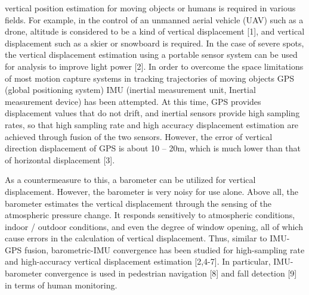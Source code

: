 \documentclass[10pt,journal,compsoc]{IEEEtran}
\begin{document}
\maketitle


\IEEEdisplaynontitleabstractindextext
\IEEEpeerreviewmaketitle


 vertical position estimation for moving objects or humans is required
in various fields. For example, in the control of an unmanned aerial vehicle
(UAV) such as a drone, altitude is considered to be a kind of vertical
displacement [1], and vertical displacement such as a skier or snowboard is
required. In the case of severe spots, the vertical displacement estimation
using a portable sensor system can be used for analysis to improve light power
[2]. In order to overcome the space limitations of most motion capture systems
in tracking trajectories of moving objects GPS (global positioning system) IMU
(inertial measurement unit,  Inertial measurement device) has been attempted.
At this time, GPS provides displacement values that do not drift,
and inertial sensors provide high sampling rates, so that high sampling rate
and high accuracy displacement estimation are achieved through fusion of the
two sensors. However, the error of vertical direction displacement of GPS is
about 10 -- 20m, which is much lower than that of horizontal displacement [3]. 

As a countermeasure to this, a barometer can be utilized for vertical
displacement. However, the barometer is very noisy for use alone. Above all,
the barometer estimates the vertical displacement through the sensing of the
atmospheric pressure change. It responds sensitively to atmospheric conditions,
indoor / outdoor conditions, and even the degree of window opening, all of
which cause errors in the calculation of vertical displacement. Thus, similar
to IMU-GPS fusion, barometric-IMU convergence has been studied for
high-sampling rate and high-accuracy vertical displacement estimation [2,4-7].
In particular, IMU-barometer convergence is used in pedestrian navigation [8]
and fall detection [9] in terms of human monitoring.
\end{document}
